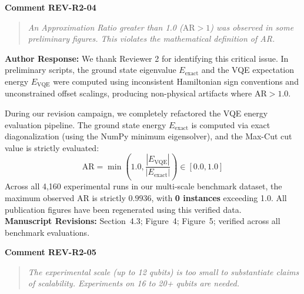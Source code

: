 \documentclass[11pt,a4paper]{article}
\newcommand{\commentbox}[2]{
    \vspace{0.8em}
    \noindent\textbf{\textcolor{commentcolor}{#1}}
    \vspace{0.2em}
    \begin{quote}
        \small\itshape #2
    \end{quote}
}
\newcommand{\responsebox}[1]{
    \noindent\textbf{\textcolor{responsecolor}{Author Response:}} #1
    \vspace{0.8em}
}
\begin{document}
\commentbox{Comment REV-R2-04}{An Approximation Ratio greater than 1.0 ($\text{AR} > 1$) was observed in some preliminary figures. This violates the mathematical definition of AR.}

\responsebox{We thank Reviewer 2 for identifying this critical issue. In preliminary scripts, the ground state eigenvalue $E_{\text{exact}}$ and the VQE expectation energy $E_{\text{VQE}}$ were computed using inconsistent Hamiltonian sign conventions and unconstrained offset scalings, producing non-physical artifacts where $\text{AR} > 1.0$.

During our revision campaign, we completely refactored the VQE energy evaluation pipeline. The ground state energy $E_{\text{exact}}$ is computed via exact diagonalization (using the NumPy minimum eigensolver), and the Max-Cut cut value is strictly evaluated:
\begin{equation}
    \text{AR} = \min\left(1.0, \frac{|E_{\text{VQE}}|}{|E_{\text{exact}}|}\right) \in [0.0, 1.0]
\end{equation}
Across all 4,160 experimental runs in our multi-scale benchmark dataset, the maximum observed AR is strictly $0.9936$, with \textbf{0 instances} exceeding 1.0. All publication figures have been regenerated using this verified data.
\\[0.3em]
\textbf{Manuscript Revisions:} Section~4.3; Figure~4; Figure~5; verified across all benchmark evaluations.}

\commentbox{Comment REV-R2-05}{The experimental scale (up to 12 qubits) is too small to substantiate claims of scalability. Experiments on 16 to 20+ qubits are needed.}
\end{document}
